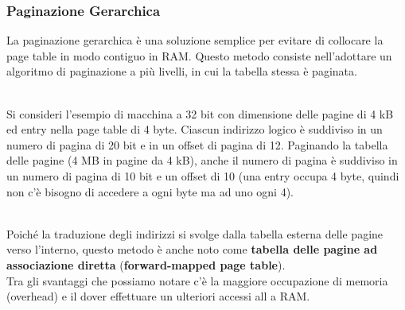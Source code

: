 \documentclass{article}
\begin{document}
			\newpage
			\subsubsection{Paginazione Gerarchica}
				La paginazione gerarchica è una soluzione semplice per evitare di collocare la page table in modo contiguo in RAM. Questo metodo consiste nell’adottare un algoritmo di paginazione a più livelli, in cui la tabella stessa è paginata. 
				\begin{figure}[ht!]
				\end{figure}
				\\Si consideri l'esempio di macchina a 32 bit con dimensione delle pagine di 4 kB ed entry nella page table di 4 byte. Ciascun indirizzo logico è suddiviso in un numero di pagina di 20 bit e in un offset di pagina di 12. Paginando la tabella delle pagine (4 MB in pagine da 4 kB), anche il numero di pagina è suddiviso in un numero di pagina di 10 bit e un offset di 10 (una entry occupa 4 byte, quindi non c'è bisogno di accedere a ogni byte ma ad uno ogni 4).
				\begin{figure}[ht!]
				\end{figure}
				\\Poiché la traduzione degli indirizzi si svolge dalla tabella esterna delle pagine verso l’interno, questo metodo è anche noto come \textbf{tabella delle pagine ad associazione diretta} (\textbf{forward-mapped page table}).
				\\Tra gli svantaggi che possiamo notare c'è la maggiore occupazione di memoria (overhead) e il dover effettuare un ulteriori accessi all a RAM.
\end{document}
